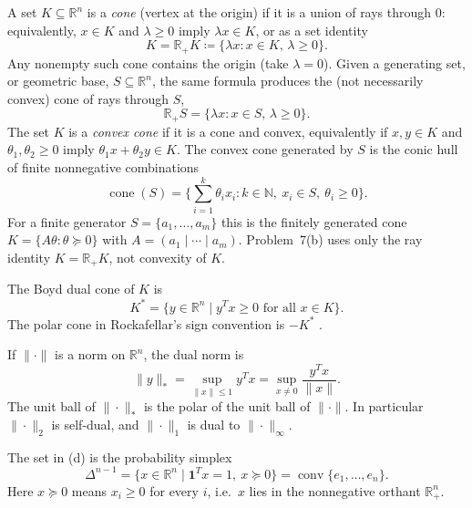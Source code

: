 \documentclass[11pt,a4paper]{article}
\begin{document}
\begin{definition}[Cone]
\label{def:p7-cone}
A set \(K\subseteq\mathbb{R}^{n}\) is a \emph{cone} (vertex at the origin) if it is a union of rays through \(0\): equivalently, \(x\in K\) and \(\lambda\ge 0\) imply \(\lambda x\in K\), or as a set identity
\[
K
=
\mathbb{R}_{+}K
\coloneqq
\bigl\{ \lambda x : x\in K,\, \lambda\ge 0 \bigr\}.
\]
Any nonempty such cone contains the origin (take \(\lambda=0\)). Given a generating set, or geometric base, \(S\subseteq\mathbb{R}^{n}\), the same formula produces the (not necessarily convex) cone of rays through \(S\),
\[
\mathbb{R}_{+}S
=
\bigl\{ \lambda x : x\in S,\, \lambda\ge 0 \bigr\}.
\]
The set \(K\) is a \emph{convex cone} if it is a cone and convex, equivalently if \(x,y\in K\) and \(\theta_{1},\theta_{2}\ge 0\) imply \(\theta_{1}x+\theta_{2}y\in K\). The convex cone generated by \(S\) is the conic hull of finite nonnegative combinations
\[
\operatorname{cone}(S)
=
\biggl\{
\sum_{i=1}^{k}\theta_{i}x_{i}
:
k\in\mathbb{N},\ 
x_{i}\in S,\ 
\theta_{i}\ge 0
\biggr\}.
\]
For a finite generator \(S=\{a_{1},\ldots,a_{m}\}\) this is the finitely generated cone \(K=\{A\theta:\theta\succeq 0\}\) with \(A=(a_{1}\mid\cdots\mid a_{m})\). Problem~7(b) uses only the ray identity \(K=\mathbb{R}_{+}K\), not convexity of \(K\).
\end{definition}

\begin{definition}
\label{def:p7-dual-cone}
The Boyd dual cone of \(K\) is
\[
K^{*}
=
\bigl\{ y\in\mathbb{R}^{n} \mid y^{T}x\ge 0\text{ for all }x\in K \bigr\}.
\]
The polar cone in Rockafellar's sign convention is \(-K^{*}\) \cite{rockafellar70}.
\end{definition}

\begin{definition}
\label{def:p7-dual-norm}
If \(\|\cdot\|\) is a norm on \(\mathbb{R}^{n}\), the dual norm is
\[
\|y\|_{*}
=
\sup_{\|x\|\le 1} y^{T}x
=
\sup_{x\neq 0}\frac{y^{T}x}{\|x\|}.
\]
The unit ball of \(\|\cdot\|_{*}\) is the polar of the unit ball of \(\|\cdot\|\). In particular \(\|\cdot\|_{2}\) is self-dual, and \(\|\cdot\|_{1}\) is dual to \(\|\cdot\|_{\infty}\).
\end{definition}

\begin{definition}
\label{def:p7-simplex}
The set in (d) is the probability simplex
\[
\Delta^{n-1}
=
\bigl\{ x\in\mathbb{R}^{n} \mid \mathbf{1}^{T}x=1,\ x\succeq 0 \bigr\}
=
\operatorname{conv}\{e_{1},\ldots,e_{n}\}.
\]
Here \(x\succeq 0\) means \(x_{i}\ge 0\) for every \(i\), i.e.\ \(x\) lies in the nonnegative orthant \(\mathbb{R}^{n}_{+}\).
\end{definition}
\end{document}
